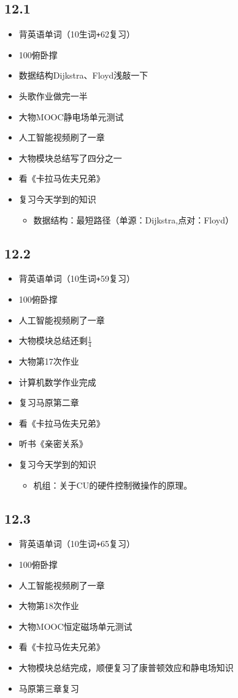 \documentclass[UTF8]{ctexart}
\begin{document}
\subsection*{12.1}
\begin{itemize}
    \item 背英语单词（10生词\verb|+|62复习）
    \item 100俯卧撑
    \item 数据结构Dijkstra、Floyd浅敲一下
    \item 头歌作业做完一半
    \item 大物MOOC静电场单元测试
    \item 人工智能视频刷了一章
    \item 大物模块总结写了四分之一
    \item 看《卡拉马佐夫兄弟》
    \item 复习今天学到的知识
          \begin{itemize}
              \item 数据结构：最短路径（单源：Dijkstra,点对：Floyd）
          \end{itemize}
\end{itemize}
\subsection*{12.2}
\begin{itemize}
    \item 背英语单词（10生词\verb|+|59复习）
    \item 100俯卧撑
    \item 人工智能视频刷了一章
    \item 大物模块总结还剩$\frac{1}{4}$
    \item 大物第17次作业
    \item 计算机数学作业完成
    \item 复习马原第二章
    \item 看《卡拉马佐夫兄弟》
    \item 听书《亲密关系》
    \item 复习今天学到的知识
          \begin{itemize}
              \item 机组：关于CU的硬件控制微操作的原理。
          \end{itemize}
\end{itemize}
\subsection*{12.3}
\begin{itemize}
    \item 背英语单词（10生词\verb|+|65复习）
    \item 100俯卧撑
    \item 人工智能视频刷了一章
    \item 大物第18次作业
    \item 大物MOOC恒定磁场单元测试
    \item 看《卡拉马佐夫兄弟》
    \item 大物模块总结完成，顺便复习了康普顿效应和静电场知识
    \item 马原第三章复习
\end{itemize}
\end{document}
